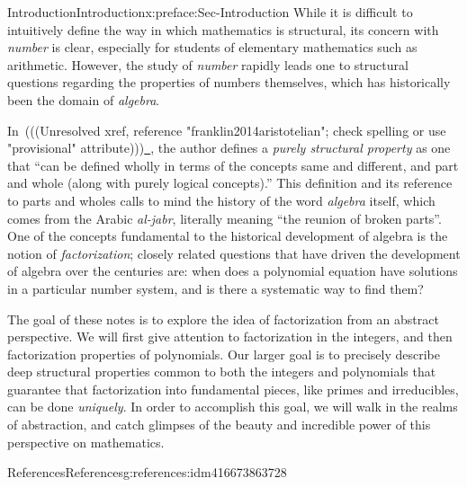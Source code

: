 \documentclass[oneside,10pt,]{book}
\numberwithin{equation}{section}
\begin{document}
\begin{preface}{Introduction}{}{Introduction}{}{}{x:preface:Sec-Introduction}
While it is difficult to intuitively define the way in which mathematics is structural, its concern with \emph{number} is clear, especially for students of elementary mathematics such as arithmetic. However, the study of \emph{number} rapidly leads one to structural questions regarding the properties of numbers themselves, which has historically been the domain of \emph{algebra}.%
\par
In~{(((Unresolved xref, reference "franklin2014aristotelian"; check spelling or use "provisional" attribute)))}\hyperlink{}{~}, the author defines a \emph{purely structural property} as one that ``can be defined wholly in terms of the concepts same and different, and part and whole (along with purely logical concepts).'' This definition and its reference to parts and wholes calls to mind the history of the word \emph{algebra} itself, which comes from the Arabic \emph{al-jabr}, literally meaning ``the reunion of broken parts''. One of the concepts fundamental to the historical development of algebra is the notion of \emph{factorization}; closely related questions that have driven the development of algebra over the centuries are: when does a polynomial equation have solutions in a particular number system, and is there a systematic way to find them?%
\par
The goal of these notes is to explore the idea of factorization from an abstract perspective. We will first give attention to factorization in the integers, and then factorization properties of polynomials. Our larger goal is to precisely describe deep structural properties common to both the integers and polynomials that guarantee that factorization into fundamental pieces, like primes and irreducibles, can be done \emph{uniquely}. In order to accomplish this goal, we will walk in the realms of abstraction, and catch glimpses of the beauty and incredible power of this perspective on mathematics.%
%
%
\typeout{************************************************}
\typeout{************************************************}
%
\begin{references--numberless}{References}{}{References}{}{}{g:references:idm416673863728}
\end{references--numberless}
\end{preface}
%
%
\typeout{************************************************}
\typeout{************************************************}
\end{document}
